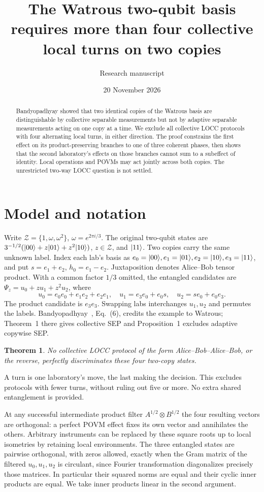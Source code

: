 \documentclass[11pt]{article}
\title{The Watrous two-qubit basis requires more than four collective local turns on two copies}
\author{Research manuscript}\date{20 November 2026}
\newtheorem{theorem}{Theorem}\newtheorem{lemma}[theorem]{Lemma}
\begin{document}
\maketitle
\begin{abstract}\noindent Bandyopadhyay showed that two identical copies of the Watrous basis are distinguishable by collective separable measurements but not by adaptive separable measurements acting on one copy at a time. We exclude all collective LOCC protocols with four alternating local turns, in either direction. The proof constrains the first effect on its product-preserving branches to one of three coherent phases, then shows that the second laboratory's effects on those branches cannot sum to a subeffect of identity. Local operations and POVMs may act jointly across both copies. The unrestricted two-way LOCC question is not settled.\end{abstract}
\section{Model and notation}
Write $\mathcal Z=\{1,\omega,\omega^2\}$, $\omega=e^{2\pi i/3}$. The original two-qubit states are $3^{-1/2}(|00\rangle+z|01\rangle+z^2|10\rangle)$, $z\in\mathcal Z$, and $|11\rangle$. Two copies carry the same unknown label. Index each lab's basis as $e_0=|00\rangle,e_1=|01\rangle,e_2=|10\rangle,e_3=|11\rangle$, and put $s=e_1+e_2$, $h_0=e_1-e_2$. Juxtaposition denotes Alice--Bob tensor product. With a common factor $1/3$ omitted, the entangled candidates are $\Psi_z=u_0+zu_1+z^2u_2$, where
\begin{equation} u_0=e_0e_0+e_1e_2+e_2e_1,\quad u_1=e_3e_0+e_0s,\quad u_2=se_0+e_0e_3.\label{states}\end{equation}
The product candidate is $e_3e_3$. Swapping labs interchanges $u_1,u_2$ and permutes the labels. Bandyopadhyay~\cite{B}, Eq.~(6), credits the example to Watrous; Theorem~1 there gives collective SEP and Proposition~1 excludes adaptive copywise SEP.
\begin{theorem}No collective LOCC protocol of the form Alice--Bob--Alice--Bob, or the reverse, perfectly discriminates these four two-copy states.\end{theorem}
A turn is one laboratory's move, the last making the decision. This excludes protocols with fewer turns, without ruling out five or more. No extra shared entanglement is provided.

At any successful intermediate product filter $A^{1/2}\otimes B^{1/2}$ the four resulting vectors are orthogonal: a perfect POVM effect fixes its own vector and annihilates the others. Arbitrary instruments can be replaced by these square roots up to local isometries by retaining local environments. The three entangled states are pairwise orthogonal, with zeros allowed, exactly when the Gram matrix of the filtered $u_0,u_1,u_2$ is circulant, since Fourier transformation diagonalizes precisely those matrices. In particular their squared norms are equal and their cyclic inner products are equal. We take inner products linear in the second argument.
\end{document}
